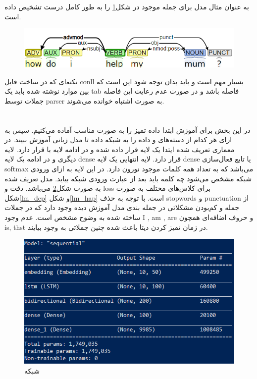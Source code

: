 \documentclass[10pt]{article}
\begin{document}
به عنوان مثال مدل برای جمله موجود در شکل\ref{dep_parser} 
را به طور کامل درست تشخیص داده است.
\begin{figure}[ht!]
	\centering\includegraphics[width=\linewidth]{../reports/dep_parser_1.png}
	\caption{
		}
	\label{dep_parser}
\end{figure}

نکته‌‌ای که در ساخت فایل conll بسیار مهم است و باید بدان توجه شود این است که بین موارد نوشته شده باید یک tab فاصله باشد و در صورت عدم رعایت این فاصله جملات توسط parser به صورت اشتباه خوانده می‌شوند.
\newpage
\section{
	}
	در این بخش برای آموزش 
	ابتدا داده تمیز را به صورت مناسب آماده می‌کنیم. سپس به ازای هر کدام از دسته‌های 
	و
	داده را به شبکه داده تا مدل زبانی آموزش ببیند. در معماری تعریف شده ایتدا یک لایه 
	قرار داده شده و در ادامه لایه 
	با 
	قرار دارد. لایه دیگری
	و در ادامه یک لایه dense قرار دارد. لایه انتهایی یک لایه dense یا تابع فعال‌سازی softmax می‌باشد که به تعداد همه کلمات موجود نورون دارد. در این لایه به ازای ورودی شبکه مشخص می‌شود چه کلمه باید بعد از عبارت ورودی شبکه بیاید.
	مدل تعریف شده به صورت شکل\ref{lm}
	می‌باشد. دقت و loss برای کلاس‌های مختلف به صورت شکل\ref{lm_dep} و شکل\ref{lm_hap} است. با توجه به حذف stopwords و punctuation از جمله و کم‌بودن مشکلاتی در جمله بندی مدل آموزش دیده وجود دارد که در جملات ساخته شده به وضوح مشخص است. عدم وجود I , am , are و حروف اضافه‌ای همچون is, thst در زمان تمیز کردن دیتا باعث شده چنین جملاتی به وجود بیایند.
	
		\begin{figure}[ht!]
		\centering\includegraphics[width=\linewidth]{../reports/lm_model.png}
		\caption{شبکه 
			}
		\label{lm}
	\end{figure}
	
\end{document}
